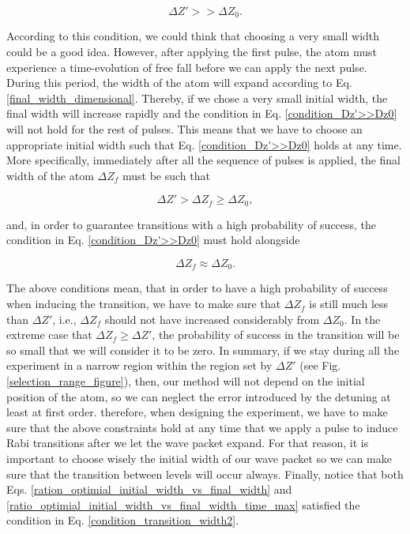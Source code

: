 \documentclass{article}
\begin{document}
\begin{equation}\label{condition_Dz'>>Dz0}
    \Delta Z' >> \Delta Z_{0}.
\end{equation}

According to this condition, we could think that choosing a very small width could be a good idea. However, after applying the first pulse, the atom must experience a time-evolution of free fall before we can apply the next pulse. During this period, the width of the atom will expand according to Eq. \ref{final_width_dimensional}. Thereby, if we chose a very small initial width, the final width will increase rapidly and the condition in Eq. \ref{condition_Dz'>>Dz0} will not hold for the rest of pulses. This means that we have to choose an appropriate initial width such that Eq. \ref{condition_Dz'>>Dz0} holds at any time. More specifically, immediately after all the sequence of pulses is applied, the final width of the atom $\Delta Z_{f}$ must be such that

\begin{equation}\label{condition_transition_width1}
    \Delta Z' > \Delta Z_{f} \ge \Delta Z_{0},
\end{equation}

and, in order to guarantee transitions with a high probability of success, the condition in Eq. \ref{condition_Dz'>>Dz0} must hold alongside

\begin{equation}\label{condition_transition_width2}
    \Delta Z_{f} \approx \Delta Z_{0}.
\end{equation}

The above conditions mean, that in order to have a high probability of success when inducing the transition, we have to make sure that $\Delta Z_{f}$ is still much less than $\Delta Z'$, i.e.,  $\Delta Z_{f}$ should not have increased considerably from $\Delta Z_{0}$. In the extreme case that $\Delta Z_{f} \ge \Delta Z'$, the probability of success in the transition will be so small that we will consider it to be zero. 
In summary, if we stay during all the experiment in a narrow region within the region set by $\Delta Z'$ (see Fig. \ref{selection_range_figure}), then, our method will not depend on the initial position of the atom, so we can neglect the error introduced by the detuning at least at first order.
therefore, when designing the experiment, we have to make sure that the above constraints hold at any time that we apply a pulse to induce Rabi transitions after we let the wave packet expand. For that reason, it is important to choose wisely the initial width of our wave packet so we can make sure that the transition between levels will occur always. Finally, notice that both Eqs. \ref{ration_optimial_initial_width_vs_final_width} and 
\ref{ratio_optimial_initial_width_vs_final_width_time_max} satisfied the condition in Eq. \ref{condition_transition_width2}.
\end{document}
